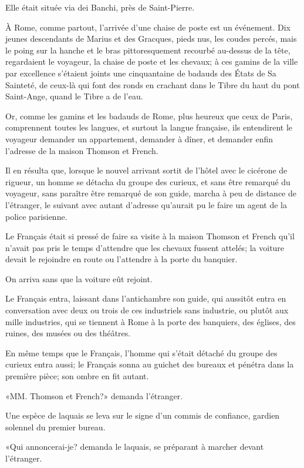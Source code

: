 Elle était située via dei Banchi, près de Saint-Pierre. 

À Rome, comme partout, l'arrivée d'une chaise de poste est un événement. Dix jeunes descendants de Marius et des Gracques, pieds nus, les coudes percés, mais le poing sur la hanche et le bras pittoresquement recourbé au-dessus de la tête, regardaient le voyageur, la chaise de poste et les chevaux; à ces gamins de la ville par excellence s'étaient joints une cinquantaine de badauds des États de Sa Sainteté, de ceux-là qui font des ronds en crachant dans le Tibre du haut du pont Saint-Ange, quand le Tibre a de l'eau. 

Or, comme les gamins et les badauds de Rome, plus heureux que ceux de Paris, comprennent toutes les langues, et surtout la langue française, ils entendirent le voyageur demander un appartement, demander à dîner, et demander enfin l'adresse de la maison Thomson et French. 

Il en résulta que, lorsque le nouvel arrivant sortit de l'hôtel avec le cicérone de rigueur, un homme se détacha du groupe des curieux, et sans être remarqué du voyageur, sans paraître être remarqué de son guide, marcha à peu de distance de l'étranger, le suivant avec autant d'adresse qu'aurait pu le faire un agent de la police parisienne. 

Le Français était si pressé de faire sa visite à la maison Thomson et French qu'il n'avait pas pris le temps d'attendre que les chevaux fussent attelés; la voiture devait le rejoindre en route ou l'attendre à la porte du banquier. 

On arriva sans que la voiture eût rejoint. 

Le Français entra, laissant dans l'antichambre son guide, qui aussitôt entra en conversation avec deux ou trois de ces industriels sans industrie, ou plutôt aux mille industries, qui se tiennent à Rome à la porte des banquiers, des églises, des ruines, des musées ou des théâtres. 

En même temps que le Français, l'homme qui s'était détaché du groupe des curieux entra aussi; le Français sonna au guichet des bureaux et pénétra dans la première pièce; son ombre en fit autant. 

«MM. Thomson et French?» demanda l'étranger. 

Une espèce de laquais se leva sur le signe d'un commis de confiance, gardien solennel du premier bureau. 

«Qui annoncerai-je? demanda le laquais, se préparant à marcher devant l'étranger. 

